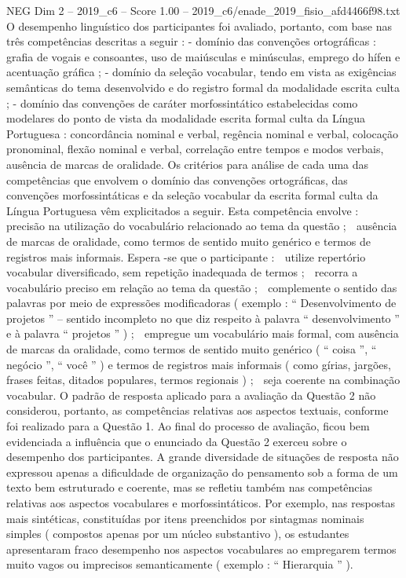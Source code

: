\begin{textsample}{NEG Dim 2 – 2019\_c6 – Score 1.00 – 2019\_c6/enade\_2019\_fisio\_afd4466f98.txt}
O desempenho linguístico dos participantes foi avaliado, portanto, com base nas três competências descritas a seguir : - domínio das convenções ortográficas : grafia de vogais e consoantes, uso de maiúsculas e minúsculas, emprego do hífen e acentuação gráfica ; - domínio da seleção vocabular, tendo em vista as exigências semânticas do tema desenvolvido e do registro formal da modalidade escrita culta ; - domínio das convenções de caráter morfossintático estabelecidas como modelares do ponto de vista da modalidade escrita formal culta da Língua Portuguesa : concordância nominal e verbal, regência nominal e verbal, colocação pronominal, flexão nominal e verbal, correlação entre tempos e modos verbais, ausência de marcas de oralidade.
Os critérios para análise de cada uma das competências que envolvem o domínio das convenções ortográficas, das convenções morfossintáticas e da seleção vocabular da escrita formal culta da Língua Portuguesa vêm explicitados a seguir.
Esta competência envolve :  precisão na utilização do vocabulário relacionado ao tema da questão ;  ausência de marcas de oralidade, como termos de sentido muito genérico e termos de registros mais informais.
Espera -se que o participante :  utilize repertório vocabular diversificado, sem repetição inadequada de termos ;  recorra a vocabulário preciso em relação ao tema da questão ;  complemente o sentido das palavras por meio de expressões modificadoras ( exemplo : “ Desenvolvimento de projetos ” – sentido incompleto no que diz respeito à palavra “ desenvolvimento ” e à palavra “ projetos ” ) ;  empregue um vocabulário mais formal, com ausência de marcas da oralidade, como termos de sentido muito genérico ( “ coisa ”, “ negócio ”, “ você ” ) e termos de registros mais informais ( como gírias, jargões, frases feitas, ditados populares, termos regionais ) ;  seja coerente na combinação vocabular.
O padrão de resposta aplicado para a avaliação da Questão 2 não considerou, portanto, as competências relativas aos aspectos textuais, conforme foi realizado para a Questão 1.
Ao final do processo de avaliação, ficou bem evidenciada a influência que o enunciado da Questão 2 exerceu sobre o desempenho dos participantes.
A grande diversidade de situações de resposta não expressou apenas a dificuldade de organização do pensamento sob a forma de um texto bem estruturado e coerente, mas se refletiu também nas competências relativas aos aspectos vocabulares e morfossintáticos.
Por exemplo, nas respostas mais sintéticas, constituídas por itens preenchidos por sintagmas nominais simples ( compostos apenas por um núcleo substantivo ), os estudantes apresentaram fraco desempenho nos aspectos vocabulares ao empregarem termos muito vagos ou imprecisos semanticamente ( exemplo : “ Hierarquia ” ).

\end{textsample}

